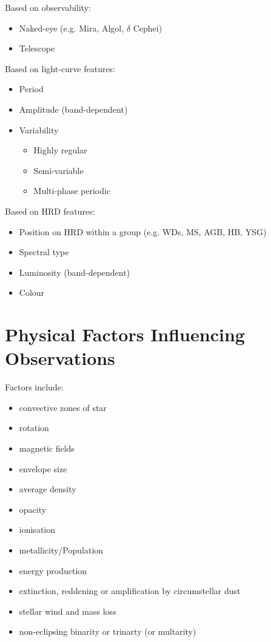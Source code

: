 \documentclass{spy}
\begin{document}
Based on observability:
\begin{itemize}
\item Naked-eye (e.g. Mira, Algol, \(\delta\) Cephei)
\item Telescope
\end{itemize}

Based on light-curve features:
\begin{itemize}
\item Period
\item Amplitude (band-dependent)
\item Variability
    \begin{itemize}
    \item Highly regular
    \item Semi-variable
    \item Multi-phase periodic
\end{itemize}\end{itemize}

Based on HRD features:
\begin{itemize}
\item Position on HRD within a group (e.g. WDs, MS, AGB, HB, YSG)
\item Spectral type
\item Luminosity (band-dependent)
\item Colour
\end{itemize}


\section{Physical Factors Influencing Observations}
Factors include:
\begin{itemize}
\item convective zones of star
\item rotation
\item magnetic fields
\item envelope size
\item average density
\item opacity
\item ionisation
\item metallicity/Population
\item energy production
\item extinction, reddening or amplification by circumstellar dust
\item stellar wind and mass loss
\item non-eclipsing binarity or trinarty (or multarity)
\end{itemize}
\end{document}
